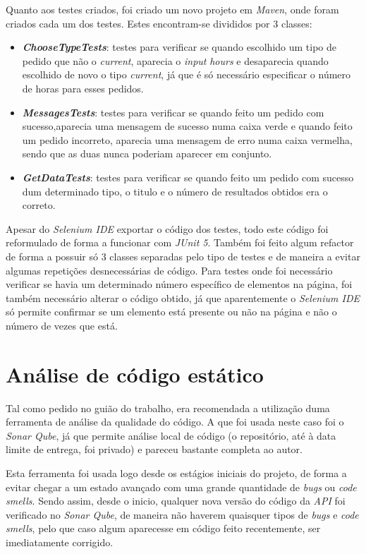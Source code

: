 Quanto aos testes criados, foi criado um novo projeto em \textit{Maven}, onde foram criados cada um dos testes. Estes encontram-se divididos por 3 classes: 
\begin{itemize}
   \item \textbf{\textit{ChooseTypeTests}}: testes para verificar se quando escolhido um tipo de pedido que não o \textit{current}, aparecia o \textit{input} \textit{hours} e desaparecia quando escolhido de novo o tipo \textit{current}, já que é só necessário especificar o número de horas para esses pedidos.
   \item \textbf{\textit{MessagesTests}}: testes para verificar se quando feito um pedido com sucesso,aparecia uma mensagem de sucesso numa caixa verde e quando feito um pedido incorreto, aparecia uma mensagem de erro numa caixa vermelha, sendo que as duas nunca poderiam aparecer em conjunto.
   \item \textbf{\textit{GetDataTests}}: testes para verificar se quando feito um pedido com sucesso dum determinado tipo, o titulo e o número de resultados obtidos era o correto.
\end{itemize}

Apesar do \textit{Selenium IDE} exportar o código dos testes, todo este código foi reformulado de forma a funcionar com \textit{JUnit 5}. Também foi feito algum refactor de forma a possuir só 3 classes separadas pelo tipo de testes e de maneira a evitar algumas repetições desnecessárias de código. Para testes onde foi necessário verificar se havia um determinado número específico de elementos na página, foi também necessário alterar o código obtido, já que aparentemente o \textit{Selenium IDE} só permite confirmar se um elemento está presente ou não na página e não o número de vezes que está.


\section{Análise de código estático}
Tal como pedido no guião do trabalho, era recomendada a utilização duma ferramenta de análise da qualidade do código. A que foi usada neste caso foi o \textit{Sonar Qube}, já que permite análise local de código (o repositório, até à data limite de entrega, foi privado) e pareceu bastante completa ao autor.

Esta ferramenta foi usada logo desde os estágios iniciais do projeto, de forma a evitar chegar a um estado avançado com uma grande quantidade de \textit{bugs} ou \textit{code smells}. Sendo assim, desde o inicio, qualquer nova versão do código da \textit{API} foi verificado no \textit{Sonar Qube}, de maneira não haverem quaisquer tipos de \textit{bugs} e \textit{code smells}, pelo que caso algum aparecesse em código feito recentemente, ser imediatamente corrigido.

